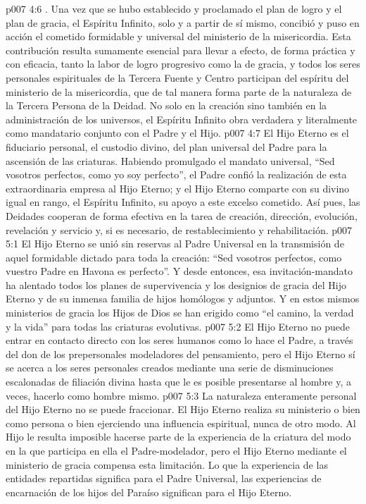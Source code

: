 \vs p007 4:6 . Una vez que se hubo establecido y proclamado el plan de logro y el plan de gracia, el Espíritu Infinito, solo y a partir de sí mismo, concibió y puso en acción el cometido formidable y universal del ministerio de la misericordia. Esta contribución resulta sumamente esencial para llevar a efecto, de forma práctica y con eficacia, tanto la labor de logro progresivo como la de gracia, y todos los seres personales espirituales de la Tercera Fuente y Centro participan del espíritu del ministerio de la misericordia, que de tal manera forma parte de la naturaleza de la Tercera Persona de la Deidad. No solo en la creación sino también en la administración de los universos, el Espíritu Infinito obra verdadera y literalmente como mandatario conjunto con el Padre y el Hijo.
\vs p007 4:7 \pc El Hijo Eterno es el fiduciario personal, el custodio divino, del plan universal del Padre para la ascensión de las criaturas. Habiendo promulgado el mandato universal, “Sed vosotros perfectos, como yo soy perfecto”, el Padre confió la realización de esta extraordinaria empresa al Hijo Eterno; y el Hijo Eterno comparte con su divino igual en rango, el Espíritu Infinito, su apoyo a este excelso cometido. Así pues, las Deidades cooperan de forma efectiva en la tarea de creación, dirección, evolución, revelación y servicio y, si es necesario, de restablecimiento y rehabilitación.
\vs p007 5:1 El Hijo Eterno se unió sin reservas al Padre Universal en la transmisión de aquel formidable dictado para toda la creación: “Sed vosotros perfectos, como vuestro Padre en Havona es perfecto”. Y desde entonces, esa invitación\hyp{}mandato ha alentado todos los planes de supervivencia y los designios de gracia del Hijo Eterno y de su inmensa familia de hijos homólogos y adjuntos. Y en estos mismos ministerios de gracia los Hijos de Dios se han erigido como “el camino, la verdad y la vida” para todas las criaturas evolutivas.
\vs p007 5:2 \pc El Hijo Eterno no puede entrar en contacto directo con los seres humanos como lo hace el Padre, a través del don de los prepersonales modeladores del pensamiento, pero el Hijo Eterno sí se acerca a los seres personales creados mediante una serie de disminuciones escalonadas de filiación divina hasta que le es posible presentarse al hombre y, a veces, hacerlo como hombre mismo.
\vs p007 5:3 La naturaleza enteramente personal del Hijo Eterno no se puede fraccionar. El Hijo Eterno realiza su ministerio o bien como persona o bien ejerciendo una influencia espiritual, nunca de otro modo. Al Hijo le resulta imposible hacerse parte de la experiencia de la criatura del modo en la que participa en ella el Padre\hyp{}modelador, pero el Hijo Eterno mediante el ministerio de gracia compensa esta limitación. Lo que la experiencia de las entidades repartidas significa para el Padre Universal, las experiencias de encarnación de los hijos del Paraíso significan para el Hijo Eterno.
